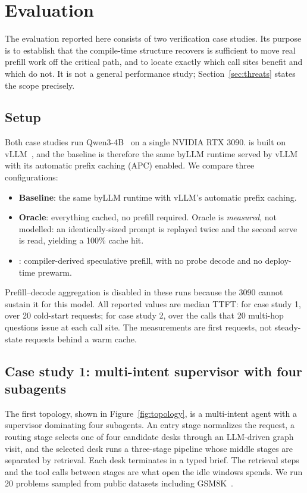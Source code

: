 \section{Evaluation}
\label{sec:eval}

The evaluation reported here consists of two verification case studies. Its
purpose is to establish that the compile-time structure \sysname{} recovers is
sufficient to move real prefill work off the critical path, and to locate exactly
which call sites benefit and which do not. It is not a general performance study;
Section~\ref{sec:threats} states the scope precisely.

\subsection{Setup}

Both case studies run Qwen3-4B~\cite{yang2025qwen3} on a single NVIDIA RTX 3090.
\sysname{} is built on vLLM~\cite{kwon2023pagedattention}, and the baseline is
therefore the same byLLM runtime served by vLLM with its automatic prefix caching
(APC) enabled. We compare three configurations:

\begin{itemize}\itemsep2pt
\item \textbf{Baseline}: the same byLLM runtime with vLLM's automatic prefix
      caching.
\item \textbf{Oracle}: everything cached, no prefill required. Oracle is
      \emph{measured}, not modelled: an identically-sized prompt is replayed
      twice and the second serve is read, yielding a 100\% cache hit.
\item \textbf{\sysname{}}: compiler-derived speculative prefill, with no probe
      decode and no deploy-time prewarm.
\end{itemize}

Prefill--decode aggregation is disabled in these runs because the 3090 cannot
sustain it for this model. All reported values are median TTFT: for case study 1,
over 20 cold-start requests; for case study 2, over the calls that 20 multi-hop
questions issue at each call site. The measurements are first requests, not
steady-state requests behind a warm cache.

\subsection{Case study 1: multi-intent supervisor with four subagents}

The first topology, shown in Figure~\ref{fig:topology}, is a multi-intent agent
with a supervisor dominating four subagents. An entry stage normalizes the
request, a routing stage selects one of four candidate desks through an
LLM-driven graph visit, and the selected desk runs a three-stage pipeline whose
middle stages are separated by retrieval. Each desk terminates in a typed brief.
The retrieval steps and the tool calls between stages are what open the idle
windows \sysname{} spends. We run 20 problems sampled from public datasets
including GSM8K~\cite{cobbe2021gsm8k}.

